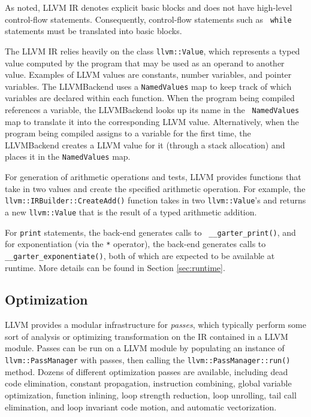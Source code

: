 \documentclass[11pt]{article}
\begin{document}
As noted, LLVM IR denotes explicit basic blocks and does not have high-level
control-flow statements.  Consequently, control-flow statements such as {\tt
while} statements must be translated into basic blocks.

The LLVM IR relies heavily on the class {\tt llvm::Value}, which represents a
typed value computed by the program that may be used as an operand to another
value.  Examples of LLVM values are constants, number variables, and pointer
variables.  The LLVMBackend uses a {\tt NamedValues} map to keep track of which
variables are declared within each function.  When the program being compiled
references a variable, the LLVMBackend looks up its name in the {\tt
NamedValues} map to translate it into the corresponding LLVM value.
Alternatively, when the program being compiled assigns to a variable for the
first time, the LLVMBackend creates a LLVM value for it (through a stack
allocation) and places it in the {\tt NamedValues} map.

For generation of arithmetic operations and tests, LLVM provides functions that
take in two values and create the specified arithmetic operation.  For example,
the {\tt llvm::IRBuilder::CreateAdd()} function takes in two {\tt llvm::Value}'s
and returns a new {\tt llvm::Value} that is the result of a typed arithmetic
addition.

For {\tt print} statements, the back-end generates calls to {\tt
\_\_garter\_print()}, and for exponentiation (via the {\tt **} operator), the
back-end generates calls to {\tt \_\_garter\_exponentiate()}, both of which are
expected to be available at runtime.  More details can be found in Section
\ref{sec:runtime}.

\subsection{Optimization}

LLVM provides a modular infrastructure for {\em passes}, which typically perform
some sort of analysis or optimizing transformation on the IR contained in a LLVM
module.  Passes can be run on a LLVM module by populating an instance of {\tt
llvm::PassManager} with passes, then calling the {\tt llvm::PassManager::run()}
method.  Dozens of different optimization passes are available, including dead
code elimination, constant propagation, instruction combining, global variable
optimization, function inlining, loop strength reduction, loop unrolling, tail
call elimination, and loop invariant code motion, and automatic vectorization.
\end{document}
